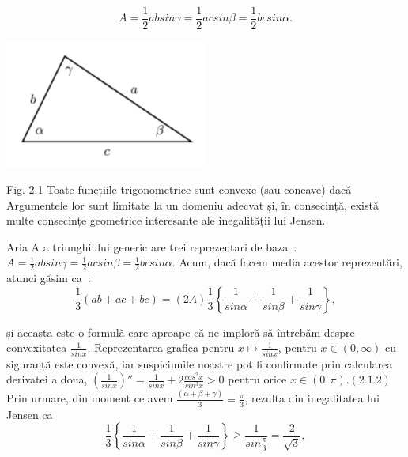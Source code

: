 \documentclass[a4paper,12pt,oneside]{report}
\begin{document}
\begin{displaymath}
  A = \frac{1}{2}ab sin\gamma = \frac{1}{2}ac sin \beta = \frac{1}{2}bc sin \alpha. 
\end{displaymath}

\begin{center}
	\includegraphics[width=0.5\textwidth]{fig2.1.png}
\end{center}

Fig. 2.1 Toate funcțiile trigonometrice sunt convexe (sau concave) dacă
Argumentele lor sunt limitate la un domeniu adecvat și, în consecință,
există multe consecințe geometrice interesante ale inegalității lui Jensen.

Aria A a triunghiului generic are trei reprezentari de baza :
\(A = \frac{1}{2}ab sin\gamma = \frac{1}{2}ac sin \beta = \frac{1}{2}bc sin \alpha. \)
Acum, dacă facem media acestor reprezentări, atunci găsim ca :
\begin{displaymath}
  \frac{1}{3}\left ( ab + ac + bc \right )= \left ( 2A \right )\frac{1}{3}\left \{ \frac{1}{sin \alpha } + \frac{1}{sin \beta } + \frac{1}{sin \gamma }\right \}, \label{eq:2.1.1} \tag{2.1.1}
\end{displaymath}

și aceasta este o formulă care aproape că ne imploră să întrebăm despre convexitatea \(\frac{1}{sin x}\). Reprezentarea grafica pentru \(x \mapsto \frac{1}{sin x}\), pentru \(x\in \left ( 0 , \infty  \right )\) cu siguranță este convexă, iar suspiciunile noastre pot fi confirmate prin calcularea derivatei a doua, \({\left ( \frac{1}{sin x} \right )}''= \frac{1}{sin x} + 2\frac{cos^{2}x}{sin ^{3}x}> 0\) pentru orice \(x\in \left ( 0, \pi  \right ) . (2.1.2)\)
	Prin urmare, din moment ce avem \(\frac{\left ( \alpha + \beta  + \gamma  \right )}{3}= \frac{\pi }{3}\), rezulta din inegalitatea lui Jensen ca 
\begin{displaymath}
  \frac{1}{3}\left \{ \frac{1}{sin \alpha }  + \frac{1}{sin \beta } + \frac{1}{sin \gamma }\right \}\geq \frac{1}{sin \frac{\pi }{3}} =  \frac{2}{\sqrt{3}}, 
\end{displaymath}
\end{document}
